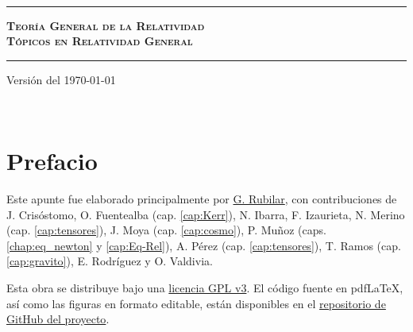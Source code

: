 \documentclass[letterpaper,11pt]{report}
\begin{document}
\sffamily

\thispagestyle{empty}
\begin{center}

    \

    \vspace{6.5cm}

    \rule{15cm}{0.1cm}

    \vspace{1.5cm}

    {\huge \textsc{\textbf{Teoría General de la Relatividad \\[0.6em] Tópicos en Relatividad General}}}

    \vspace{1.5cm}

    \rule{15cm}{0.1cm}

    \vspace{1.5cm}

    Versión del \today

\end{center}


\newpage
\thispagestyle{empty}
\ \\
\newpage
\setcounter{page}{1}

\pagestyle{plain}
\chapter*{Prefacio}
\bigskip
\bigskip
\bigskip
\bigskip
\bigskip
\bigskip



Este apunte fue elaborado principalmente por \href{https://gfrubi.github.io/}{G. Rubilar}, con contribuciones de J. Crisóstomo, O. Fuentealba (cap. \ref{cap:Kerr}), N. Ibarra, F. Izaurieta, N. Merino (cap. \ref{cap:tensores}), J. Moya (cap. \ref{cap:cosmo}), P. Muñoz (caps. \ref{chap:eq_newton} y \ref{cap:Eq-Rel}), A. Pérez (cap. \ref{cap:tensores}), T. Ramos (cap. \ref{cap:gravito}), E. Rodríguez y O. Valdivia.

\bigskip
\bigskip
\bigskip
\bigskip
\bigskip
\bigskip



Esta obra se distribuye bajo una \href{https://github.com/gfrubi/RG/blob/master/LICENSE}{licencia GPL v3}. El código fuente en pdf\LaTeX, así como las figuras en formato editable, están disponibles en el \href{https://github.com/gfrubi/RG}{repositorio de GitHub del proyecto}.


\bigskip
\bigskip
\bigskip
\end{document}
